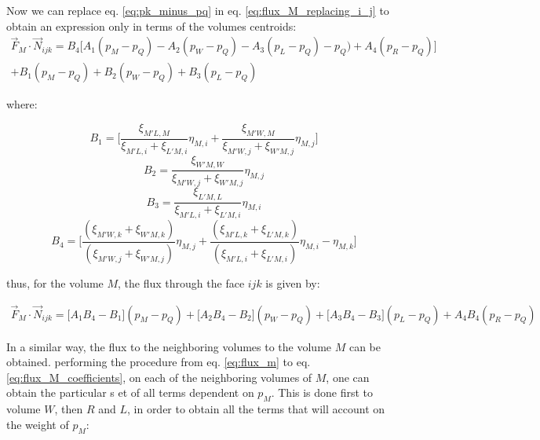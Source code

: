 \documentclass{article}
\begin{document}
Now we can replace eq. \ref{eq:pk_minus_pq} in eq. \ref{eq:flux_M_replacing_i_j} to obtain an expression only in terms of the volumes centroids:
\begin{equation} \label{eq:no_i_j_k_terms}
\begin{split}
\vec{F}_{M} \cdot \vec{N}_{ijk} = B_{4}\Bigg[A_{1}(p_{M}- p_{Q})-A_{2}(p_{W} - p_{Q}) - A_{3}(p_{L} -p_{Q})-p_{Q})+A_{4}(p_{R} - p_{Q})\Bigg] \\
+ B_{1}(p_{M} - p_{Q}) + B_{2}(p_{W} - p_{Q})+B_{3}(p_{L} - p_{Q})
\end{split}
\end{equation}

where:

\begin{displaymath}
B_{1} = \Bigg[\frac{\xi_{M'L,M}}{\xi_{M'L,i} + \xi_{L'M,i}}\eta_{M,i} + \frac{\xi_{M'W,M}}{\xi_{M'W,j} + \xi_{W'M,j}}\eta_{M,j} \Bigg]
\end{displaymath}
\begin{displaymath}
B_{2} = \frac{\xi_{W'M,W}}{\xi_{M'W,j} + \xi_{W'M,j}}\eta_{M,j}
\end{displaymath}
\begin{displaymath}
B_{3} = \frac{\xi_{L'M,L}}{\xi_{M'L,i} + \xi_{L'M,i}}\eta_{M,i}
\end{displaymath}
\begin{displaymath}
B_{4} = \Bigg[ \frac{(\xi_{M'W,k} + \xi_{W'M,k})}{(\xi_{M'W,j} + \xi_{W'M,j})}\eta_{M,j} + \frac{(\xi_{M'L,k} + \xi_{L'M,k})}{(\xi_{M'L,i} + \xi_{L'M,i})}\eta_{M,i} -\eta_{M,k} \Bigg]
\end{displaymath}

thus, for the volume $ M $, the flux through the face $ ijk $ is given by:

\begin{equation} \label{eq:flux_M_coefficients}
\begin{split}
\vec{F}_{M} \cdot \vec{N}_{ijk} = \Bigg[A_{1}B_{4}-B_{1}\Bigg] (p_{M}-p_{Q})+ \Bigg[A_{2}B_{4}-B_{2}\Bigg](p_{W} - p_{Q})+\Bigg[A_{3}B_{4}-B_{3}\Bigg](p_{L} - p_{Q})+A_{4}B_{4}(p_{R} - p_{Q})
\end{split}
\end{equation}

In a similar way, the flux to the neighboring volumes to the volume $ M $ can be obtained. performing the procedure from eq. \ref{eq:flux_m} to eq. \ref{eq:flux_M_coefficients}, on each of the neighboring volumes of $ M $, one can obtain the particular s et of all terms dependent on $ p_{M} $. This is done first to volume $ W $, then $ R $ and $ L $, in order to obtain all the terms that will account on the weight of $ p_{M} $:
\end{document}
